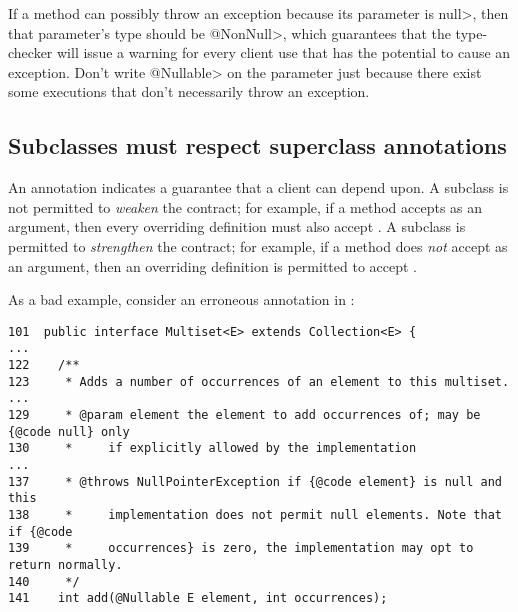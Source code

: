 If a method can possibly throw an exception because its parameter
is \<null>, then that parameter's type should be \<@NonNull>, which
guarantees that the type-checker will issue a warning for every client
use that has the potential to cause an exception.  Don't write
\<@Nullable> on the parameter just because there exist some executions that
don't necessarily throw an exception.



\subsection{Subclasses must respect superclass annotations\label{annotations-are-a-contract}}

An annotation indicates a guarantee that a client can depend upon.  A subclass
is not permitted to \emph{weaken} the contract; for example,
if a method accepts  as an argument, then every overriding
definition must also accept .
A subclass is permitted to \emph{strengthen} the contract; for example,
if a method does \emph{not} accept  as an argument, then an
overriding definition is permitted to accept .

\begin{sloppypar}
As a bad example, consider an erroneous  annotation in
\href{https://github.com/google/guava/blob/master/guava/src/com/google/common/collect/Multiset.java\#L129}{}:
\end{sloppypar}

\begin{Verbatim}
101  public interface Multiset<E> extends Collection<E> {
...
122    /**
123     * Adds a number of occurrences of an element to this multiset.
...
129     * @param element the element to add occurrences of; may be {@code null} only
130     *     if explicitly allowed by the implementation
...
137     * @throws NullPointerException if {@code element} is null and this
138     *     implementation does not permit null elements. Note that if {@code
139     *     occurrences} is zero, the implementation may opt to return normally.
140     */
141    int add(@Nullable E element, int occurrences);
\end{Verbatim}

